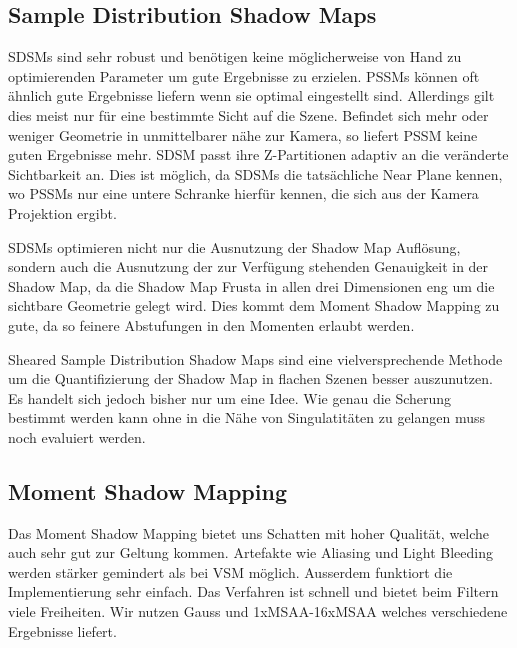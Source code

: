 \documentclass[runningheaders,a4paper]{llncs}
\begin{document}
\subsection{Sample Distribution Shadow Maps}
SDSMs sind sehr robust und benötigen keine möglicherweise von Hand zu optimierenden Parameter um gute Ergebnisse zu erzielen.
PSSMs können oft ähnlich gute Ergebnisse liefern wenn sie optimal eingestellt sind.
Allerdings gilt dies meist nur für eine bestimmte Sicht auf die Szene.
Befindet sich mehr oder weniger Geometrie in unmittelbarer nähe zur Kamera, so liefert PSSM keine guten Ergebnisse mehr.
SDSM passt ihre Z-Partitionen adaptiv an die veränderte Sichtbarkeit an.
Dies ist möglich, da SDSMs die tatsächliche Near Plane kennen, wo PSSMs nur eine untere Schranke hierfür kennen, die sich aus der Kamera Projektion ergibt.

SDSMs optimieren nicht nur die Ausnutzung der Shadow Map Auflösung, sondern auch die Ausnutzung der zur Verfügung stehenden Genauigkeit in der Shadow Map, da die Shadow Map Frusta in allen drei Dimensionen eng um die sichtbare Geometrie gelegt wird.
Dies kommt dem Moment Shadow Mapping zu gute, da so feinere Abstufungen in den Momenten erlaubt werden.

Sheared Sample Distribution Shadow Maps sind eine vielversprechende Methode um die Quantifizierung der Shadow Map in flachen Szenen besser auszunutzen.
Es handelt sich jedoch bisher nur um eine Idee.
Wie genau die Scherung bestimmt werden kann ohne in die Nähe von Singulatitäten zu gelangen muss noch evaluiert werden.



\subsection{Moment Shadow Mapping}
Das Moment Shadow Mapping bietet uns Schatten mit hoher Qualität, welche auch sehr gut zur Geltung kommen. Artefakte wie Aliasing und Light Bleeding werden stärker gemindert als bei VSM möglich. Ausserdem funktiort die Implementierung sehr einfach. Das Verfahren ist schnell und bietet beim Filtern viele Freiheiten. Wir nutzen Gauss und 1xMSAA-16xMSAA welches verschiedene Ergebnisse liefert.
\end{document}
